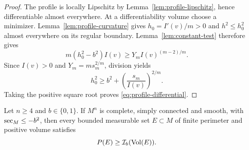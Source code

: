 \begin{proof}
The profile is locally Lipschitz by
Lemma~\ref{lem:profile-lipschitz}, hence differentiable almost
everywhere.  At a differentiability volume choose a minimizer.
Lemma~\ref{lem:profile-curvature} gives
$h_0=I'(v)/m>0$ and $h^2\le h_0^2$ almost everywhere on its regular
boundary.  Lemma~\ref{lem:constant-test} therefore gives
\[
 m(h_0^2-b^2)I(v)\ge Y_m I(v)^{(m-2)/m}.
\]
Since $I(v)>0$ and $Y_m=m s_m^{2/m}$, division yields
\[
 h_0^2\ge b^2+\left(\frac{s_m}{I(v)}\right)^{2/m}.
\]
Taking the positive square root proves
\eqref{eq:profile-differential}.
\end{proof}

\begin{theorem}
\label{thm:normalized-comparison}
Let $n\ge4$ and $b\in\{0,1\}$.  If $M^n$ is complete, simply
connected and smooth, with $\operatorname{sec}_M\le-b^2$, then every bounded measurable
set $E\subset M$ of finite perimeter and positive volume satisfies
\[
 P(E)\ge\mathcal I_b(\operatorname{Vol}(E)).
\]
\end{theorem}

